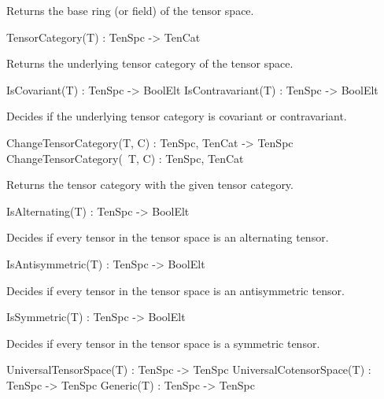 Returns the base ring (or field) of the tensor space.

\begin{intrinsics}
TensorCategory(T) : TenSpc -> TenCat
\end{intrinsics}

Returns the underlying tensor category of the tensor space.

\begin{intrinsics}
IsCovariant(T) : TenSpc -> BoolElt
IsContravariant(T) : TenSpc -> BoolElt
\end{intrinsics}

Decides if the underlying tensor category is covariant or contravariant.

\begin{intrinsics}
ChangeTensorCategory(T, C) : TenSpc, TenCat -> TenSpc
ChangeTensorCategory(~T, C) : TenSpc, TenCat
\end{intrinsics}

Returns the tensor category with the given tensor category.

\begin{intrinsics}
IsAlternating(T) : TenSpc -> BoolElt
\end{intrinsics}

Decides if every tensor in the tensor space is an alternating tensor.

\begin{intrinsics}
IsAntisymmetric(T) : TenSpc -> BoolElt
\end{intrinsics}

Decides if every tensor in the tensor space is an antisymmetric tensor.

\begin{intrinsics}
IsSymmetric(T) : TenSpc -> BoolElt
\end{intrinsics}

Decides if every tensor in the tensor space is a symmetric tensor.

\begin{intrinsics}
UniversalTensorSpace(T) : TenSpc -> TenSpc
UniversalCotensorSpace(T) : TenSpc -> TenSpc
Generic(T) : TenSpc -> TenSpc
\end{intrinsics}

